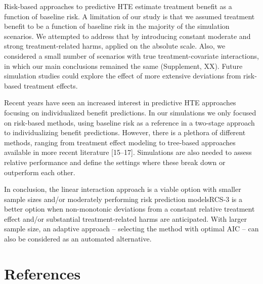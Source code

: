 \documentclass[]{elsarticle} %
\begin{document}
Risk-based approaches to predictive HTE estimate treatment benefit as a
function of baseline risk. A limitation of our study is that we assumed
treatment benefit to be a function of baseline risk in the majority of
the simulation scenarios. We attempted to address that by introducing
constant moderate and strong treatment-related harms, applied on the
absolute scale. Also, we considered a small number of scenarios with
true treatment-covariate interactions, in which our main conclusions
remained the same (Supplement, XX). Future simulation studies could
explore the effect of more extensive deviations from risk-based
treatment effects.

Recent years have seen an increased interest in predictive HTE
approaches focusing on individualized benefit predictions. In our
simulations we only focused on risk-based methods, using baseline risk
as a reference in a two-stage approach to individualizing benefit
predictions. However, there is a plethora of different methods, ranging
from treatment effect modeling to tree-based approaches available in
more recent literature {[}15--17{]}. Simulations are also needed to
assess relative performance and define the settings where these break
down or outperform each other.

In conclusion, the linear interaction approach is a viable option with
smaller sample sizes and/or moderately performing risk prediction
modelsRCS-3 is a better option when non-monotonic deviations from a
constant relative treatment effect and/or substantial treatment-related
harms are anticipated. With larger sample size, an adaptive approach --
selecting the method with optimal AIC -- can also be considered as an
automated alternative.

\newpage

\hypertarget{references}{%
\section{References}\label{references}}

\setlength{\parindent}{-0.25in}
\setlength{\leftskip}{0.25in}

\noindent
\end{document}
